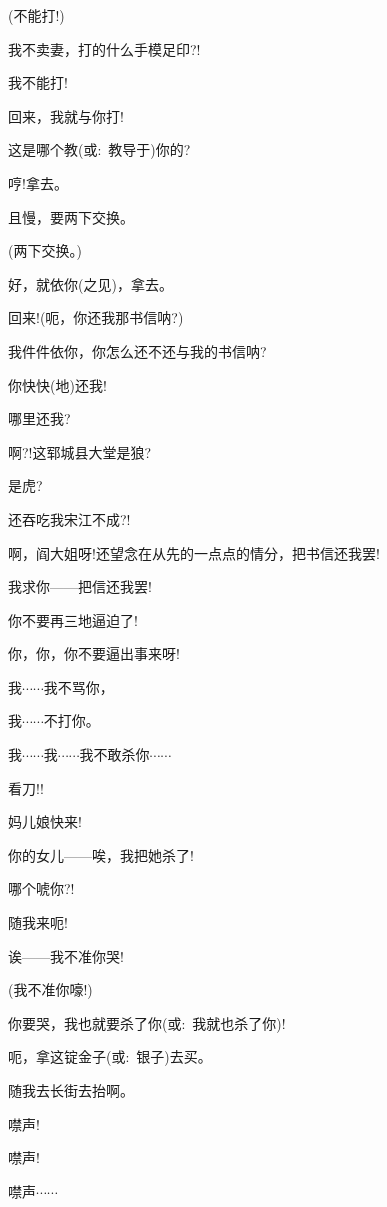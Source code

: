 {{(不能打!)}\hspace{10pt}~

{我不卖妻，打的什么手模足印?!}

{我不能打!}

{回来，我就与你打!}

{这是哪个教(或:~教导于)你的?}

{哼!拿去。}

{且慢，要两下交换。}

{(两下交换。)}

{好，就依你(之见)，拿去。}

{回来!(呃，你还我那书信呐?)}

{我件件依你，你怎么还不还与我的书信呐?}

{你快快(地)还我!}

{哪里还我?}

{啊?!这郓城县大堂是狼?}

{是虎?}\hspace{20pt}~

{还吞吃我宋江不成?!}

{啊，阎大姐呀!还望念在从先的一点点的情分，把书信还我罢!}

{我求你------把信还我罢!}

{你不要再三地逼迫了!}

{你，你，你不要逼出事来呀!}

{我$\cdots{}\cdots{}$我不骂你，}

{我$\cdots{}\cdots{}$不打你。}

{我$\cdots{}\cdots{}$我$\cdots{}\cdots{}$我不敢杀你$\cdots{}\cdots{}$}

{看刀!!}\hspace{20pt}~

{妈儿娘快来!}

{你的女儿------唉，我把她杀了!}

{哪个唬你?!}

{随我来呃!}

{诶------我不准你哭!}

{(我不准你嚎!)}

{你要哭，我也就要杀了你(或:~我就也杀了你)!}

{呃，拿这锭金子(或:~银子)去买。}

{随我去长街去抬啊。}

{噤声!}\hspace{20pt}~

{噤声!}\hspace{20pt}~

{噤声$\cdots{}\cdots{}$}

}
